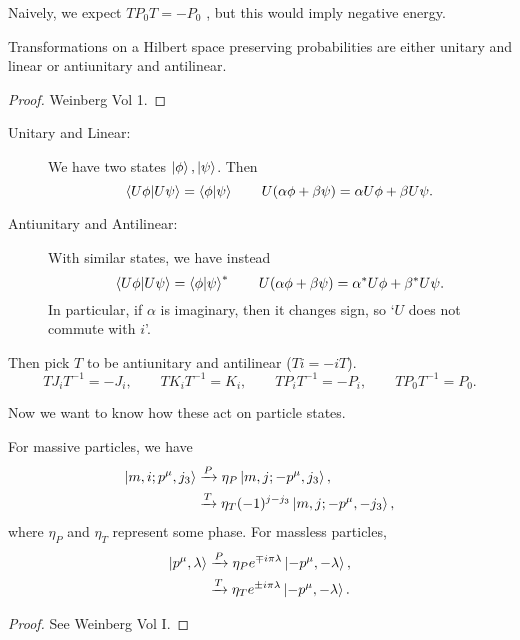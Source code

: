 Naively, we expect $T P_0 T = -P_0$ , but this would imply negative energy.
\begin{theorem}[Wigner]
  Transformations on a Hilbert space preserving probabilities are either unitary and linear or antiunitary and antilinear.
\end{theorem}
\begin{proof}
  Weinberg Vol 1.
\end{proof}
\begin{description}
  \item[Unitary and Linear:] We have two states $\ket{\phi}, \ket{\psi}$. Then
    \begin{equation}
      \bra{U \phi} \ket{U \psi} = \bra{\phi}\ket{\psi} \qquad U (\alpha \phi + \beta \psi) = \alpha U \phi + \beta U \psi.
    \end{equation}
  \item[Antiunitary and Antilinear:] With similar states, we have instead
    \begin{equation}
      \bra{U \phi} \ket{U \psi} = \bra{\phi}\ket{\psi}^* \qquad U (\alpha \phi + \beta \psi) = \alpha^* U \phi + \beta^* U \psi.
    \end{equation}
    In particular, if $\alpha$ is imaginary, then it changes sign, so `$U$ does not commute with $i$'.
\end{description}
Then pick $T$ to be antiunitary and antilinear ($Ti = -i T$).
\begin{equation}
  T J_i T^{-1} = -J_i, \qquad
  T K_i T^{-1} = K_i, \qquad
  T P_i T^{-1} = -P_i, \qquad
  T P_0 T^{-1} = P_0.
\end{equation}

Now we want to know how these act on particle states.
\begin{claim}
  For massive particles, we have
  \begin{align}
    \ket{m, i; p^{\mu}, j_3} &\xrightarrow{P} \eta_P \ket{m, j; -p^{\mu}, j_3}, \\
			     &\xrightarrow{T} \eta_T (-1)^{j-j_3} \ket{m, j; -p^{\mu}, -j_3},
  \end{align}
  where $\eta_P$ and $\eta_T$ represent some phase.
  For massless particles, 
  \begin{align}
    \ket{p^{\mu}, \lambda} &\xrightarrow{P} \eta_P e^{\mp i \pi \lambda} \ket{-p^{\mu}, -\lambda}, \\
			     &\xrightarrow{T} \eta_T e^{\pm i \pi \lambda} \ket{-p^{\mu}, -\lambda}.
  \end{align}
\end{claim}
\begin{proof}
  See Weinberg Vol I.
\end{proof}

